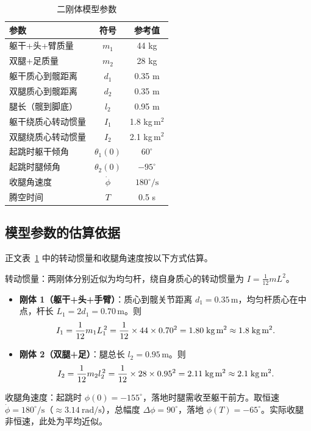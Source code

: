 \documentclass{article}
\begin{document}
\begin{table}[h]
\centering
\caption{二刚体模型参数}
\label{tab:two_body_params}
\begin{tabular}{lcc}
\toprule
参数 & 符号 & 参考值 \\
\midrule
躯干+头+臂质量 & $m_1$ & 44 kg \\
双腿+足质量 & $m_2$ & 28 kg \\
躯干质心到髋距离 & $d_1$ & 0.35 m \\
双腿质心到髋距离 & $d_2$ & 0.35 m \\
腿长（髋到脚底） & $l_2$ & 0.95 m \\
躯干绕质心转动惯量 & $I_1$ & 1.8 kg\,m$^2$ \\
双腿绕质心转动惯量 & $I_2$ & 2.1 kg\,m$^2$ \\
起跳时躯干倾角 & $\theta_1(0)$ & $60^\circ$ \\
起跳时腿倾角 & $\theta_2(0)$ & $-95^\circ$ \\
收腿角速度 & $\dot\phi$ & $180^\circ/\text{s}$ \\
腾空时间 & $T$ & 0.5 s \\
\bottomrule
\end{tabular}
\end{table}

\subsection{模型参数的估算依据}
正文表~\ref{tab:two_body_params} 中的转动惯量和收腿角速度按以下方式估算。

转动惯量：两刚体分别近似为均匀杆，绕自身质心的转动惯量为 $I = \frac{1}{12}mL^2$。
\begin{itemize}
  \item \textbf{刚体 1（躯干+头+手臂）}：质心到髋关节距离 $d_1=0.35$\,m，均匀杆质心在中点，杆长 $L_1 = 2d_1 = 0.70$\,m。则
    \[
    I_1 = \frac{1}{12}m_1 L_1^{\,2}
        = \frac{1}{12}\times 44 \times 0.70^2
        = 1.80\;\text{kg\,m$^2$}
        \approx 1.8\;\text{kg\,m$^2$}.
    \]
  \item \textbf{刚体 2（双腿+足）}：腿总长 $l_2 = 0.95$\,m。则
    \[
    I_2 = \frac{1}{12}m_2 l_2^{\,2}
        = \frac{1}{12}\times 28 \times 0.95^2
        = 2.11\;\text{kg\,m$^2$}
        \approx 2.1\;\text{kg\,m$^2$}.
    \]
\end{itemize}

收腿角速度：起跳时 $\phi(0) = -155^\circ$，落地时腿需收至躯干前方。取恒速 $\dot\phi = 180^\circ/\mathrm{s}$（$\approx 3.14\ \mathrm{rad/s}$），总幅度 $\Delta\phi = 90^\circ$，落地 $\phi(T) = -65^\circ$。实际收腿非恒速，此处为平均近似。
\end{document}

